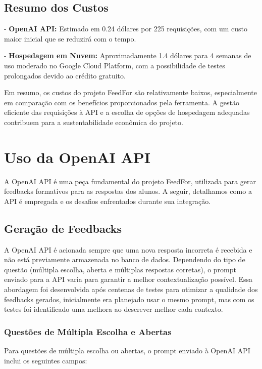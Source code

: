 \subsection{Resumo dos Custos}

- \textbf{OpenAI API:} Estimado em 0.24 dólares por 225 requisições, com um custo maior inicial que se reduzirá com o tempo.

- \textbf{Hospedagem em Nuvem:} Aproximadamente 1.4 dólares para 4 semanas de uso moderado no Google Cloud Platform, com a possibilidade de testes prolongados devido ao crédito gratuito.

Em resumo, os custos do projeto FeedFor são relativamente baixos, especialmente em comparação com os benefícios proporcionados pela ferramenta. A gestão eficiente das requisições à API e a escolha de opções de hospedagem adequadas contribuem para a sustentabilidade econômica do projeto.

\section{Uso da OpenAI API}

A OpenAI API é uma peça fundamental do projeto FeedFor, utilizada para gerar feedbacks formativos para as respostas dos alunos. A seguir, detalhamos como a API é empregada e os desafios enfrentados durante sua integração.

\subsection{Geração de Feedbacks}

A OpenAI API é acionada sempre que uma nova resposta incorreta é recebida e não está previamente armazenada no banco de dados. Dependendo do tipo de questão (múltipla escolha, aberta e múltiplas respostas corretas), o prompt enviado para a API varia para garantir a melhor contextualização possível. Essa abordagem foi desenvolvida após centenas de testes para otimizar a qualidade dos feedbacks gerados, inicialmente era planejado usar o mesmo prompt, mas com os testes foi identificado uma melhora ao descrever melhor cada contexto.

\subsubsection{Questões de Múltipla Escolha e Abertas}

Para questões de múltipla escolha ou abertas, o prompt enviado à OpenAI API inclui os seguintes campos:

